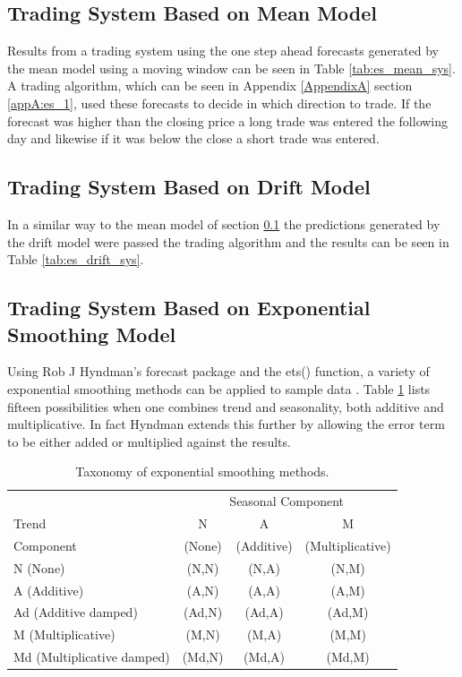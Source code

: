\subsection{Trading System Based on Mean Model}
\label{sec:es:mean}
Results from a trading system using the one step ahead forecasts generated by the mean model using a moving window can be seen in Table \ref{tab:es_mean_sys}. A trading algorithm, which can be seen in Appendix \ref{AppendixA} section \ref{appA:es_1}, used these forecasts to decide in which direction to trade. If the forecast was higher than the closing price a long trade was entered the following day and likewise if it was below the close a short trade was entered.




\subsection{Trading System Based on Drift Model}
In a similar way to the mean model of section \ref{sec:es:mean} the predictions generated by the drift model were passed the trading algorithm and the results can be seen in Table \ref{tab:es_drift_sys}. 



\subsection{Trading System Based on Exponential Smoothing Model}

Using Rob J Hyndman's forecast package and the ets() function, a variety of exponential smoothing methods can be applied to sample data \citep{Hyndman08automatictime}. Table \ref{tab:tax_em} lists fifteen possibilities when one combines trend and seasonality, both additive and multiplicative. In fact Hyndman extends this further by allowing the error term to be either added or multiplied against the results. 

\begin{table}[ht]
\centering
\caption[Taxonomy of exponential smoothing methods]{Taxonomy of exponential smoothing methods.} 
\label{tab:tax_em}
\begin{tabular}{lccc}
  \toprule 
            & \multicolumn{3}{c}{Seasonal Component} \\
  \cmidrule(r){2-4}
  Trend     & N      & A          & M       \\ 
  Component &(None)  &(Additive)  & (Multiplicative)  \\
  \midrule 
  N (None) & (N,N)&(N,A)&(N,M)  \\ 
  A (Additive) & (A,N)&	(A,A)&(A,M)  \\ 
  Ad (Additive damped) &(Ad,N)&(Ad,A)&(Ad,M) \\ 
  M (Multiplicative) &(M,N)&(M,A)&(M,M)  \\ 
  Md (Multiplicative damped) &(Md,N)&(Md,A)&(Md,M) \\ 
   \bottomrule \end{tabular}
\end{table}

